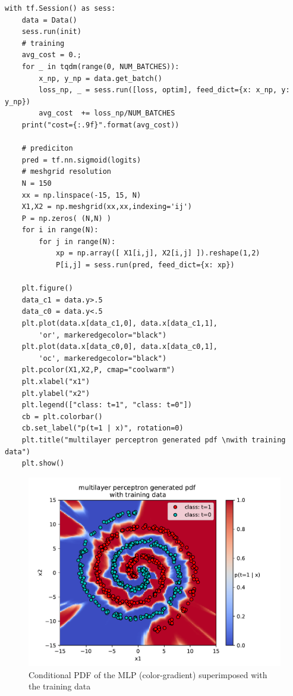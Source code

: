 \documentclass[10pt,a4paper]{article}
\begin{document}
\begin{verbatim}
with tf.Session() as sess:
    data = Data()
    sess.run(init)
    # training
    avg_cost = 0.;
    for _ in tqdm(range(0, NUM_BATCHES)):
        x_np, y_np = data.get_batch()
        loss_np, _ = sess.run([loss, optim], feed_dict={x: x_np, y: y_np})
        avg_cost  += loss_np/NUM_BATCHES
    print("cost={:.9f}".format(avg_cost))

    # prediciton
    pred = tf.nn.sigmoid(logits)
    # meshgrid resolution
    N = 150
    xx = np.linspace(-15, 15, N)
    X1,X2 = np.meshgrid(xx,xx,indexing='ij')
    P = np.zeros( (N,N) )
    for i in range(N):
        for j in range(N):
            xp = np.array([ X1[i,j], X2[i,j] ]).reshape(1,2)
            P[i,j] = sess.run(pred, feed_dict={x: xp})

    plt.figure()
    data_c1 = data.y>.5
    data_c0 = data.y<.5
    plt.plot(data.x[data_c1,0], data.x[data_c1,1],
        'or', markeredgecolor="black")
    plt.plot(data.x[data_c0,0], data.x[data_c0,1],
        'oc', markeredgecolor="black")
    plt.pcolor(X1,X2,P, cmap="coolwarm")
    plt.xlabel("x1")
    plt.ylabel("x2")
    plt.legend(["class: t=1", "class: t=0"])
    cb = plt.colorbar()
    cb.set_label("p(t=1 | x)", rotation=0)
    plt.title("multilayer perceptron generated pdf \nwith training data")
    plt.show()
\end{verbatim}

\begin{figure}[h]
\centering
\includegraphics[width=\textwidth]{Figure_1.pdf}
\caption{Conditional PDF of the MLP (color-gradient) superimposed with the training data}
\end{figure}
\end{document}

